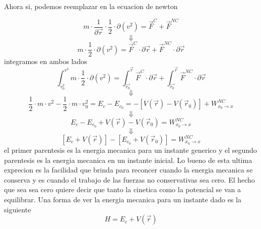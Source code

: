 \documentclass[../Main.tex]{subfiles}
\begin{document}
\npage{
}
{

Ahora si, podemos reemplazar en la ecuacion de newton

\begin{equation*}
     m \cdot \frac{1}{\partial \vec{r}} \cdot \frac{1}{2} \cdot \partial \left( v^2 \right) = \vec{F}^{C} + \vec{F}^{NC}
\end{equation*}
\begin{equation*}
     \Downarrow
\end{equation*}
\begin{equation*}
     m \cdot \frac{1}{2} \cdot \partial \left( v^2 \right) = \vec{F}^{C} \cdot \partial \vec{r} + \vec{F}^{NC} \cdot \partial \vec{r}
\end{equation*}
integramos en ambos lados
\begin{equation*}
     \int_{v_0^2}^{v^2} m \cdot \frac{1}{2} \cdot \partial \left( v^2 \right) = \int_{\vec{r_0}}^{\vec{r}} \vec{F}^{C} \cdot \partial \vec{r} + \int_{\vec{r_0}}^{\vec{r}} \vec{F}^{NC} \cdot \partial \vec{r}
\end{equation*}
\begin{equation*}
     \Downarrow
\end{equation*}
\begin{equation*}
    \frac{1}{2} \cdot m \cdot v^2 - \frac{1}{2} \cdot m \cdot v_0^2 = E_c - E_{c_0}= - \left[ V(\vec{r}) - V(\vec{r}_0) \right] + W_{x_0 \rightarrow x}^{NC}
\end{equation*}
\begin{equation*}
     \Downarrow
\end{equation*}
\begin{equation*}
    E_c - E_{c_0} + V(\vec{r}) - V(\vec{r}_0) = W_{x_0 \rightarrow x}^{NC}
\end{equation*}
\begin{equation*}
     \Downarrow
\end{equation*}
\begin{equation}
    \left[ E_c + V(\vec{r}) \right] - \left[E_{c_0} + V(\vec{r}_0) \right] = W_{x_0 \rightarrow x}^{NC}
    \label{eq:deltae}
\end{equation}
el primer parentesis es la energia mecanica para un instante generico y el segundo
parentesis es la energia mecanica en un instante inicial. Lo bueno de esta
ultima exprecion es la facilidad que brinda para reconcer cuando la energia
mecanica se conserva y es cuando el trabajo de las fuerzas no conservativas
sea cero. El hecho que sea sea cero quiere decir que tanto la cinetica como
la potencial se van a equilibrar.
Una forma de ver la energia mecanica para un instante dado es la siguiente
\begin{equation*}
    H =  E_c + V(\vec{r})
\end{equation*}

}
\end{document}
